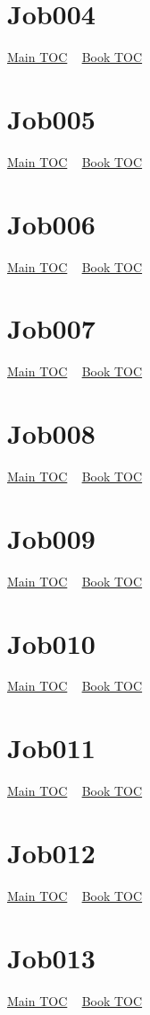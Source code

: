 \documentclass{book}
\begin{document}
  \section{Job004}\hyperlink{toc}{Main TOC} ~ \hyperref[subsec:Job]{Book TOC} 
  \section{Job005}\hyperlink{toc}{Main TOC} ~ \hyperref[subsec:Job]{Book TOC} 
  \section{Job006}\hyperlink{toc}{Main TOC} ~ \hyperref[subsec:Job]{Book TOC} 
  \section{Job007}\hyperlink{toc}{Main TOC} ~ \hyperref[subsec:Job]{Book TOC} 
  \section{Job008}\hyperlink{toc}{Main TOC} ~ \hyperref[subsec:Job]{Book TOC} 
  \section{Job009}\hyperlink{toc}{Main TOC} ~ \hyperref[subsec:Job]{Book TOC} 
  \section{Job010}\hyperlink{toc}{Main TOC} ~ \hyperref[subsec:Job]{Book TOC} 
  \section{Job011}\hyperlink{toc}{Main TOC} ~ \hyperref[subsec:Job]{Book TOC} 
  \section{Job012}\hyperlink{toc}{Main TOC} ~ \hyperref[subsec:Job]{Book TOC} 
  \section{Job013}\hyperlink{toc}{Main TOC} ~ \hyperref[subsec:Job]{Book TOC} 
\end{document}
